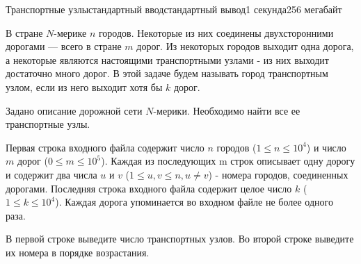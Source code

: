 \begin{problem}{Транспортные узлы}{стандартный ввод}{стандартный вывод}{1 секунда}{256 мегабайт}

В стране $N$-мерике $n$ городов. Некоторые из них соединены двухсторонними дорогами --- всего в стране $m$ дорог. Из некоторых городов выходит одна дорога, а некоторые являются настоящими транспортными узлами - из них выходит достаточно много дорог. В этой задаче будем называть город транспортным узлом, если из него выходит хотя бы $k$ дорог. 

Задано описание дорожной сети $N$-мерики. Необходимо найти все ее транспортные узлы. 

\InputFile
Первая строка входного файла содержит число $n$ городов ($1 \le n \le 10^4$) и число $m$ дорог ($0 \le m \le 10^5$). Каждая из последующих m строк описывает одну дорогу и содержит два числа $u$ и $v$ ($1 \le u, v \le n, u \neq v$) - номера городов, соединенных дорогами. Последняя строка входного файла содержит целое число $k$ ($1 \le k \le 10^4$).
Каждая дорога упоминается во входном файле не более одного раза. 


\OutputFile
В первой строке выведите число транспортных узлов. Во второй строке выведите их номера в порядке возрастания.

\Examples

\begin{example}
%
%
\end{example}

\end{problem}

